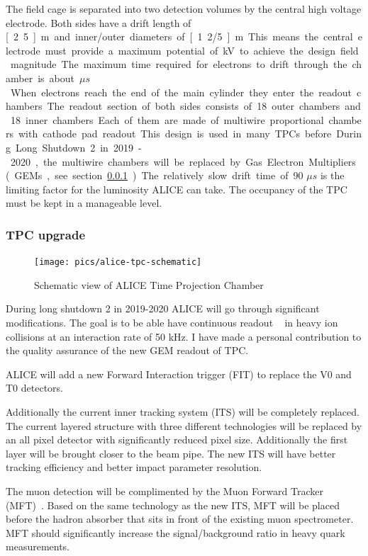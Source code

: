 The field cage is separated into two detection volumes by the central high voltage electrode. Both sides have a drift length of \unit[2.5]{m} and inner/outer diameters of \unit[1.2/5]{m}. This means the central electrode must provide a maximum potential of \unit[100]{kV} to achieve the design field magnitude. The maximum time required for electrons to drift through the chamber is about \unit[90]{$\mu s$}.

When electrons reach the end of the main cylinder they enter the readout chambers. The readout section of both sides consists of 18 outer chambers and 18 inner chambers. Each of them are made of multiwire proportional chambers with cathode pad readout. This design is used in many TPCs before. During Long Shutdown 2 in 2019-2020, the multiwire chambers will be replaced by Gas Electron Multipliers (GEMs, see section \ref{sec:tpcupgrade}).

The relatively slow drift time of 90 $\mu s$ is the limiting factor for the luminosity ALICE can take. The occupancy of the TPC must be kept in a manageable level. 


\subsubsection{TPC upgrade}
\label{sec:tpcupgrade}
\begin{figure}[htb]
\centering
\texttt{[image: pics/alice-tpc-schematic]}
\caption[TPC]{Schematic view of ALICE Time Projection Chamber}
\label{fig:tpc}
\end{figure}
During long shutdown 2 in 2019-2020 ALICE will go through significant modifications. The goal is to be able have continuous readout ~\cite{aliceupgrade} in heavy ion collisions at an interaction rate of 50 kHz. I have made a personal contribution to the quality assurance of the new GEM readout of TPC.

ALICE will add a new Forward Interaction trigger (FIT) to replace the V0 and T0 detectors. 

Additionally the current inner tracking system (ITS) will be completely replaced. The current layered structure with three different technologies will be replaced by an all pixel detector with significantly reduced pixel size. Additionally the first layer will be brought closer to the beam pipe. The new ITS will have better tracking efficiency and  better impact parameter resolution. 

The muon detection will be complimented by the Muon Forward Tracker (MFT)~\cite{mft}. Based on the same technology as the new ITS, MFT will be placed before the hadron absorber that sits in front of the existing muon spectrometer. MFT should significantly increase the signal/background ratio in heavy quark measurements.

